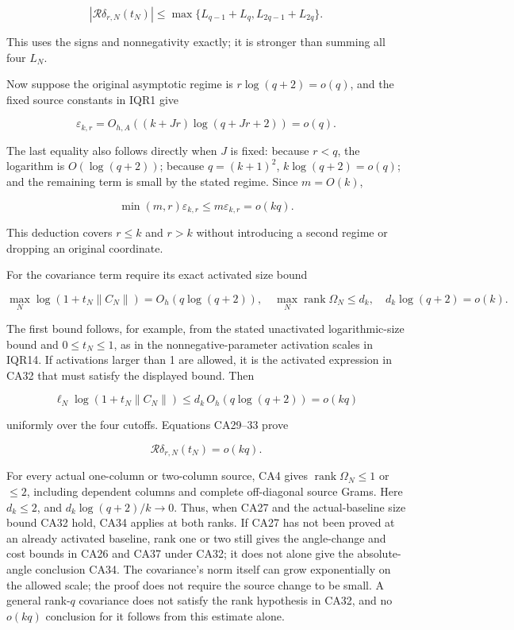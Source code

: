 \[
|\mathcal R\delta_{r,N}(t_N)|
\le\max\{L_{q-1}+L_q,L_{2q-1}+L_{2q}\}.
\tag{CA29}
\]

This uses the signs and nonnegativity exactly; it is stronger than summing all four \(L_N\).

Now suppose the original asymptotic regime is \(r\log(q+2)=o(q)\), and the fixed source constants in IQR1 give

\[
\varepsilon_{k,r}=O_{h,A}((k+Jr)\log(q+Jr+2))=o(q).
\tag{CA30}
\]

The last equality also follows directly when \(J\) is fixed: because \(r<q\), the logarithm is \(O(\log(q+2))\); because \(q=(k+1)^2\), \(k\log(q+2)=o(q)\); and the remaining term is small by the stated regime. Since \(m=O(k)\),

\[
\min(m,r)\varepsilon_{k,r}\le m\varepsilon_{k,r}=o(kq).
\tag{CA31}
\]

This deduction covers \(r\le k\) and \(r>k\) without introducing a second regime or dropping an original coordinate.

For the covariance term require its exact activated size bound

\[
\max_N\log(1+t_N\|C_N\|)=O_h(q\log(q+2)),
\quad \max_N\operatorname{rank}\Omega_N\le d_k,
\quad d_k\log(q+2)=o(k).
\tag{CA32}
\]

The first bound follows, for example, from the stated unactivated logarithmic-size bound and \(0\le t_N\le1\), as in the nonnegative-parameter activation scales in IQR14. If activations larger than 1 are allowed, it is the activated expression in CA32 that must satisfy the displayed bound. Then

\[
\ell_N\log(1+t_N\|C_N\|)
\le d_k\,O_h(q\log(q+2))=o(kq)
\tag{CA33}
\]

uniformly over the four cutoffs. Equations CA29--33 prove

\[
\mathcal R\delta_{r,N}(t_N)=o(kq).
\tag{CA34}
\]

For every actual one-column or two-column source, CA4 gives \(\operatorname{rank}\Omega_N\le1\) or \(\le2\), including dependent columns and complete off-diagonal source Grams. Here \(d_k\le2\), and \(d_k\log(q+2)/k\to0\). Thus, when CA27 and the actual-baseline size bound CA32 hold, CA34 applies at both ranks. If CA27 has not been proved at an already activated baseline, rank one or two still gives the angle-change and cost bounds in CA26 and CA37 under CA32; it does not alone give the absolute-angle conclusion CA34. The covariance's norm itself can grow exponentially on the allowed scale; the proof does not require the source change to be small. A general rank-\(q\) covariance does not satisfy the rank hypothesis in CA32, and no \(o(kq)\) conclusion for it follows from this estimate alone.

